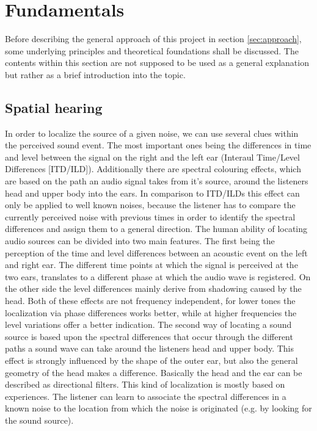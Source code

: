 \documentclass[a4paper,11pt]{article}%
\renewcommand{\\}{\vspace*{0.5\baselineskip} \newline}
\begin{document}
\section{Fundamentals}
\label{sec:fundamentals}
Before describing the general approach of this project in section \ref{sec:approach}, some underlying principles and theoretical foundations shall be discussed. The contents within this section are not supposed to be used as a general explanation but rather as a brief introduction into the topic.

\subsection{Spatial hearing}
In order to localize the source of a given noise, we can use several clues within the perceived sound event. The most important ones being the differences in time and level between the signal on the right and the left ear (Interaul Time/Level Differences [ITD/ILD]). Additionally there are spectral colouring effects, which are based on the path an audio signal takes from it's source, around the listeners head and upper body into the ears. In comparison to ITD/ILDs this effect can only be applied to well known noises, because the listener has to compare the currently perceived noise with previous times in order to identify the spectral differences and assign them to a general direction.   
\newline
\newline
The human ability of locating audio sources can be divided into two main features. The first being the perception of the time and level differences between an acoustic event on the left and right ear. The different time points at which the signal is perceived at the two ears, translates to a different phase at which the audio wave is registered. On the other side the level differences mainly derive from shadowing caused by the head. Both of these effects are not frequency independent, for lower tones the localization via phase differences works better, while at higher frequencies the level variations offer a better indication.
\newline
\newline
The second way of locating a sound source is based upon the spectral differences that occur through the different paths a sound wave can take around the listeners head and upper body. This effect is strongly influenced by the shape of the outer ear, but also the general geometry of the head makes a difference. Basically the head and the ear can be described as directional filters. This kind of localization is mostly based on experiences. The listener can learn to associate the spectral differences in a known noise to the location from which the noise is originated (e.g. by looking for the sound source).
\end{document}
